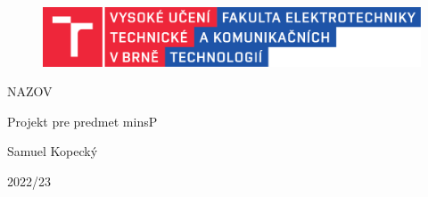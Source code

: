 \begin{titlepage}
\raggedright
\begin{figure}[h!]
    \centering
    \includegraphics[width=\textwidth]{images/FEKT_barevne_CMYK_CZ_crop.pdf}
\end{figure}

\vspace*{0.40\textheight}
\MakeUppercase{\LARGE NAZOV} 

\LARGE{Projekt pre predmet minsP}

\vspace*{0.005\textheight}
{\Large Samuel Kopecký}

\vspace*{\fill}
{\large 2022/23}

\end{titlepage}